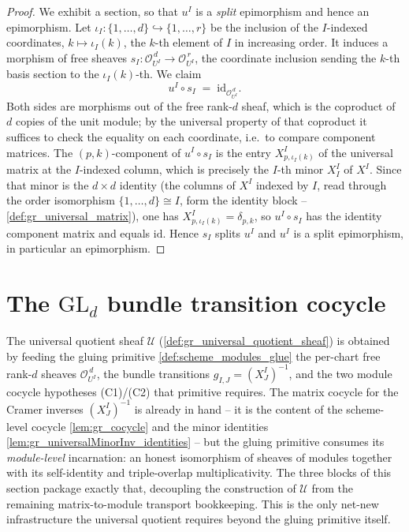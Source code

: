 \begin{proof}
  We exhibit a section, so that \(u^I\) is a \emph{split} epimorphism and hence an
  epimorphism. Let \(\iota_I : \{1,\dots,d\} \hookrightarrow \{1,\dots,r\}\) be the
  inclusion of the \(I\)-indexed coordinates, \(k \mapsto \iota_I(k)\), the
  \(k\)-th element of \(I\) in increasing order. It induces a morphism of free
  sheaves \(s_I : \mathcal{O}_{U^I}^{\,d} \to \mathcal{O}_{U^I}^{\,r}\), the
  coordinate inclusion sending the \(k\)-th basis section to the
  \(\iota_I(k)\)-th. We claim
  \[
    u^I \circ s_I \;=\; \mathrm{id}_{\mathcal{O}_{U^I}^{\,d}}.
  \]
  Both sides are morphisms out of the free rank-\(d\) sheaf, which is the coproduct
  of \(d\) copies of the unit module; by the universal property of that coproduct
  it suffices to check the equality on each coordinate, i.e.\ to compare component
  matrices. The \((p,k)\)-component of \(u^I \circ s_I\) is the entry
  \(X^I_{p,\iota_I(k)}\) of the universal matrix at the \(I\)-indexed column, which
  is precisely the \(I\)-th minor \(X^I_I\) of \(X^I\). Since that minor is the
  \(d \times d\) identity (the columns of \(X^I\) indexed by \(I\), read through the
  order isomorphism \(\{1,\dots,d\} \cong I\), form the identity block --
  \cref{def:gr_universal_matrix}), one has \(X^I_{p,\iota_I(k)} = \delta_{p,k}\),
  so \(u^I \circ s_I\) has the identity component matrix and equals
  \(\mathrm{id}\). Hence \(s_I\) splits \(u^I\) and \(u^I\) is a split
  epimorphism, in particular an epimorphism.
\end{proof}

\section{The \(\mathrm{GL}_d\) bundle transition cocycle}
\label{sec:grquot_bundle_cocycle}

The universal quotient sheaf \(\mathcal{U}\) (\cref{def:gr_universal_quotient_sheaf}) is
obtained by feeding the gluing primitive \cref{def:scheme_modules_glue} the per-chart free
rank-\(d\) sheaves \(\mathcal{O}_{U^I}^{\,d}\), the bundle transitions
\(g_{I,J} = (X^I_J)^{-1}\), and the two module cocycle hypotheses (C1)/(C2) that primitive
requires. The matrix cocycle for the Cramer inverses \((X^I_J)^{-1}\) is already in hand --
it is the content of the scheme-level cocycle \cref{lem:gr_cocycle} and the minor identities
\cref{lem:gr_universalMinorInv_identities} -- but the gluing primitive consumes its
\emph{module-level} incarnation: an honest isomorphism of sheaves of modules together with
its self-identity and triple-overlap multiplicativity. The three blocks of this section
package exactly that, decoupling the construction of \(\mathcal{U}\) from the remaining
matrix-to-module transport bookkeeping. This is the only net-new infrastructure the
universal quotient requires beyond the gluing primitive itself.

